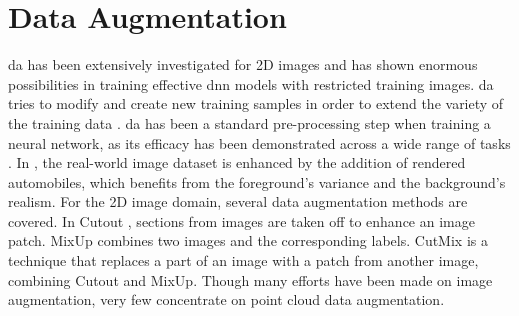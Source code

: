 \section{Data Augmentation}
\acrfull{da} has been extensively investigated for 2D images \parencite{transfsim2000, NIPS2000_ba9a56ce} and has shown enormous possibilities in training effective \acrshort{dnn} models with restricted training images. \acrshort{da} tries to modify and create new training samples in order to extend the variety of the training data \parencite{xiao2022polarmix}. \acrshort{da} has been a standard pre-processing step when training a neural network, as its efficacy has been demonstrated across a wide range of tasks \parencite{lidar_aug, second2018, pointmixup2020}. In \parencite{abs-1708-01566}, the real-world image dataset is enhanced by the addition of rendered automobiles, which benefits from the foreground's variance and the background's realism. For the 2D image domain, several data augmentation methods are covered. In Cutout \parencite{cutout}, sections from images are taken off to enhance an image patch. MixUp \parencite{mixup} combines two images and the corresponding labels. CutMix \parencite{cutmix} is a technique that replaces a part of an image with a patch from another image, combining Cutout and MixUp. Though many efforts have been made on image augmentation, very few concentrate on point cloud data augmentation.


